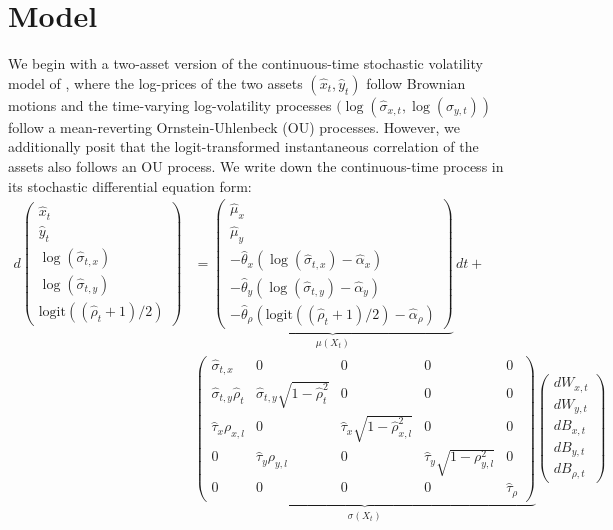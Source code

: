 \documentclass[10pt]{article}
\begin{document}
\section{Model}
We begin with a two-asset version of the continuous-time stochastic
volatility model of \cite{hull1987pricing}, where the log-prices of
the two assets $(\hat{x}_t, \hat{y}_t)$ follow Brownian motions and
the time-varying log-volatility processes
$(\log(\hat{\sigma}_{x,t}, \log(\hat{\sigma}_{y,t}))$ follow a
mean-reverting Ornstein-Uhlenbeck (OU) processes. However, we
additionally posit that the logit-transformed instantaneous
correlation of the assets also follows an OU process. We write down
the continuous-time process in its stochastic differential equation form:
\begin{align}
  d \left( \begin{array}{c}
           \hat{x}_t \\
           \hat{y}_t \\
           \log( \hat{ \sigma }_{t,x}) \\
           \log( \hat{ \sigma }_{t,y}) \\
           \mbox{logit}((\hat{\rho}_{t} + 1)/2)
         \end{array} \right) & =
                               \underbrace{\left( \begin{array}{c}
                                        \hat{\mu}_x \\
                                        \hat{\mu}_y \\
                                        -\hat{\theta}_x(\log(\hat{\sigma}_{t,x}) - \hat{\alpha}_x) \\
                                        -\hat{\theta}_y(\log(\hat{\sigma}_{t,y}) - \hat{\alpha}_y) \\
                                        -\hat{\theta}_\rho\left(\mbox{logit}((\hat{\rho}_{t}+1)/2) - \hat{\alpha}_\rho\right)
                                      \end{array} \right)}_{\mu(X_t)}\,dt  + \nonumber \\
  & \underbrace{ \left( \begin{array}{ccccc}
           \hat{\sigma}_{t,x} & 0 & 0 & 0 & 0 \\
           \hat{\sigma}_{t,y}\hat{\rho}_t & \hat{\sigma}_{t,y}\sqrt{1-\hat{\rho}_t^2} &0 &0 &0 \\
           \hat{\tau}_x \rho_{x,l} & 0 & \hat{\tau}_x\sqrt{1-\hat{\rho}_{x,l}^2} & 0 & 0 \\
           0 & \hat{\tau}_y\rho_{y,l} & 0 & \hat{\tau}_y\sqrt{1-\rho_{y,l}^2} & 0 \\
           0& 0& 0& 0& \hat{\tau}_{\rho}
         \end{array} \right)}_{\sigma(X_t)}
  \left( \begin{array}{c}
           dW_{x,t} \\
           dW_{y,t} \\
           dB_{x,t} \\
           dB_{y,t} \\
           dB_{\rho,t}
         \end{array} \right) \label{eq:cont-evoluation}
\end{align}
\end{document}

